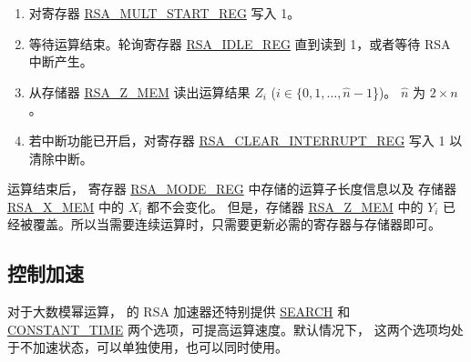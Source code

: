 \documentclass[main\_\_CN.tex]{subfiles}
\begin{document}
\begin{enumerate}
        只需要根据运算子长度，将这两个运算子中有效的数据写入存储器，没有使用到的存储器可以是任意值。
        
    \item 对寄存器 \hyperref[regdesc:RSAMULTSTARTREG]{RSA\_MULT\_START\_REG} 写入 1。

    \item 等待运算结束。轮询寄存器 \hyperref[regdesc:RSAIDLEREG]{RSA\_IDLE\_REG} 直到读到 1，或者等待 RSA 中断产生。
    
    \item 从存储器 \hyperref[regdesc:RSAmemory]{RSA\_Z\_MEM} 读出运算结果 \begin{math}Z_{i}\end{math} (\begin{math}i \in \{ 0, 1, \dots, \hat{n}-1 \end{math}\})。
        \begin{math}\hat{n}\end{math} 为  \begin{math} 2 \times n \end{math} 。

    \item 若中断功能已开启，对寄存器 \hyperref[regdesc:RSACLEARINTERRUPTREG]{RSA\_CLEAR\_INTERRUPT\_REG} 写入 1 以清除中断。

\end{enumerate}

运算结束后，
寄存器 \hyperref[regdesc:RSAMODEXPMODEREG]{RSA\_MODE\_REG} 中存储的运算子长度信息以及
存储器 \hyperref[regdesc:RSAmemory]{RSA\_X\_MEM} 中的 \begin{math}{X}_{i}\end{math} 都不会变化。
但是，存储器 \hyperref[regdesc:RSAmemory]{RSA\_Z\_MEM} 中的 \begin{math}{Y}_{i}\end{math}
已经被覆盖。所以当需要连续运算时，只需要更新必需的寄存器与存储器即可。

\subsection{控制加速}\label{sec:Accelerate options}

对于大数模幂运算，\chipname{} 的 RSA 加速器还特别提供 \hyperref[regdesc:RSASEARCHENABLEREG]{SEARCH} 和 \hyperref[regdesc:RSACONSTANTTIMEREG]{CONSTANT\_TIME} 两个选项，可提高运算速度。默认情况下， 这两个选项均处于不加速状态，可以单独使用，也可以同时使用。
\end{document}
